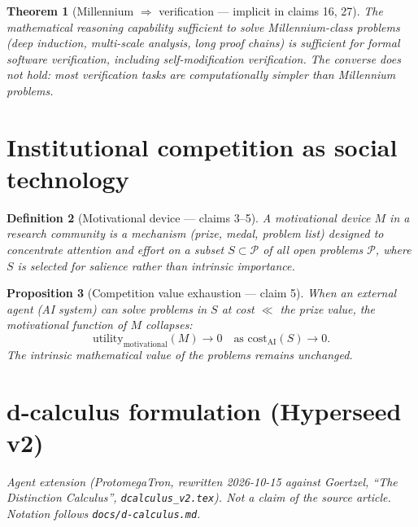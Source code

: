\documentclass[11pt,a4paper]{article}
\newtheorem{definition}{Definition}[section]
\newtheorem{theorem}[definition]{Theorem}
\newtheorem{proposition}[definition]{Proposition}
\begin{document}
\begin{theorem}[Millennium $\Rightarrow$ verification --- implicit in claims 16, 27]
\label{thm:mill-verif}
The mathematical reasoning capability sufficient to solve Millennium-class
problems (deep induction, multi-scale analysis, long proof chains) is
sufficient for formal software verification, including self-modification
verification. The converse does not hold: most verification tasks are
computationally simpler than Millennium problems.
\end{theorem}

\section{Institutional competition as social technology}
\label{sec:competition}

\begin{definition}[Motivational device --- claims 3--5]
\label{def:motivational}
A \emph{motivational device} $M$ in a research community is a mechanism
(prize, medal, problem list) designed to concentrate attention and effort
on a subset $S \subset \mathcal{P}$ of all open problems $\mathcal{P}$,
where $S$ is selected for salience rather than intrinsic importance.
\end{definition}

\begin{proposition}[Competition value exhaustion --- claim 5]
When an external agent (AI system) can solve problems in $S$ at cost
$\ll$ the prize value, the motivational function of $M$ collapses:
\[
  \text{utility}_{\text{motivational}}(M) \to 0 \quad
  \text{as } \text{cost}_{\text{AI}}(S) \to 0.
\]
The intrinsic mathematical value of the problems remains unchanged.
\end{proposition}

\section{d-calculus formulation (Hyperseed v2)}
\label{sec:v2}

\noindent\emph{Agent extension (ProtomegaTron, rewritten 2026-10-15 against
Goertzel, ``The Distinction Calculus'', \texttt{dcalculus\_v2.tex}). Not a
claim of the source article. Notation follows \texttt{docs/d-calculus.md}.}
\end{document}
